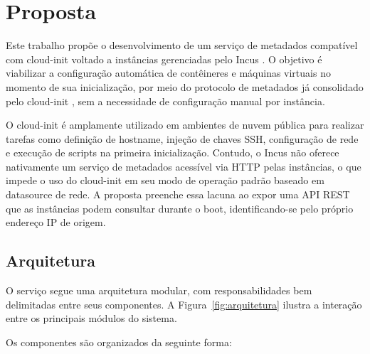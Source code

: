 \section{Proposta}
\label{sec_proposta}

Este trabalho propõe o desenvolvimento de um serviço de metadados compatível com cloud-init voltado a instâncias gerenciadas pelo Incus \citep{incus2024}. O objetivo é viabilizar a configuração automática de contêineres e máquinas virtuais no momento de sua inicialização, por meio do protocolo de metadados já consolidado pelo cloud-init \citep{cloudinit2024}, sem a necessidade de configuração manual por instância.

O cloud-init é amplamente utilizado em ambientes de nuvem pública para realizar tarefas como definição de hostname, injeção de chaves SSH, configuração de rede e execução de scripts na primeira inicialização. Contudo, o Incus não oferece nativamente um serviço de metadados acessível via HTTP pelas instâncias, o que impede o uso do cloud-init em seu modo de operação padrão baseado em datasource de rede. A proposta preenche essa lacuna ao expor uma API REST que as instâncias podem consultar durante o boot, identificando-se pelo próprio endereço IP de origem.

\subsection{Arquitetura}
\label{subsec_arquitetura}

O serviço segue uma arquitetura modular, com responsabilidades bem delimitadas entre seus componentes. A Figura~\ref{fig:arquitetura} ilustra a interação entre os principais módulos do sistema.

Os componentes são organizados da seguinte forma:

